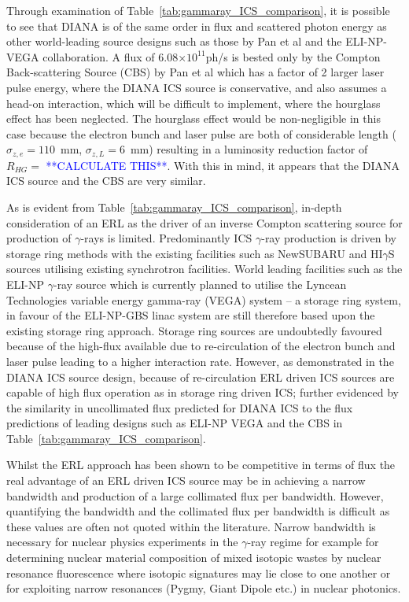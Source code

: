 \documentclass[../main.tex]{subfiles}
\begin{document}
Through examination of Table~\ref{tab:gammaray_ICS_comparison}, it is possible to see that DIANA is of the same order in flux and scattered photon energy as other world-leading source designs such as those by Pan et al and the ELI-NP-VEGA collaboration. A flux of 6.08$\times 10^{11}$ph/\si{\second} is bested only by the Compton Back-scattering Source (CBS) by Pan et al \cite{pan2019design} which has a factor of 2 larger laser pulse energy, where the DIANA ICS source is conservative, and also assumes a head-on interaction, which will be difficult to implement, where the hourglass effect has been neglected. The hourglass effect would be non-negligible in this case because the electron bunch and laser pulse are both of considerable length ($\sigma_{z,e} = 110$~\si{\milli\meter}, $\sigma_{z,L} = 6$~\si{\milli\meter}) resulting in a luminosity reduction factor of $R_{HG} = $ \textcolor{blue}{**CALCULATE THIS**}. With this in mind, it appears that the DIANA ICS source and the CBS are very similar. 

As is evident from Table~\ref{tab:gammaray_ICS_comparison}, in-depth consideration of an ERL as the driver of an inverse Compton scattering source for production of $\gamma$-rays is limited. Predominantly ICS $\gamma$-ray production is driven by storage ring methods with the existing facilities such as NewSUBARU \cite{utsunomiya2015gamma} and HI$\gamma$S \cite{weller2009research} sources utilising existing synchrotron facilities. World leading facilities such as the ELI-NP $\gamma$-ray source which is currently planned to utilise the Lyncean Technologies variable energy gamma-ray (VEGA) system \cite{tanaka2020current,elinp2019vega} -- a storage ring system, in favour of the ELI-NP-GBS \cite{adriani2014technical}linac system are still therefore based upon the existing storage ring approach. Storage ring sources are undoubtedly favoured because of the high-flux available due to re-circulation of the electron bunch and laser pulse leading to a higher interaction rate. However, as demonstrated in the DIANA ICS source design, because of re-circulation ERL driven ICS sources are capable of high flux operation as in storage ring driven ICS; further evidenced by the similarity in uncollimated flux predicted for DIANA ICS to the flux predictions of leading designs such as ELI-NP VEGA and the CBS \cite{pan2019design} in Table~\ref{tab:gammaray_ICS_comparison}. 

Whilst the ERL approach has been shown to be competitive in terms of flux the real advantage of an ERL driven ICS source may be in achieving a narrow bandwidth and production of a large collimated flux per bandwidth. However, quantifying the bandwidth and the collimated flux per bandwidth is difficult as these values are often not quoted within the literature. Narrow bandwidth is necessary for nuclear physics experiments in the $\gamma$-ray regime for example for determining nuclear material composition of mixed isotopic wastes by nuclear resonance fluorescence where isotopic signatures may lie close to one another or for exploiting narrow resonances (Pygmy, Giant Dipole etc.) in nuclear photonics. 
\end{document}
